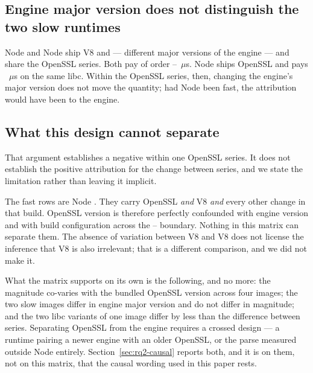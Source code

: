 \documentclass[pdflatex,sn-basic,twocolumn]{sn-jnl}%
\begin{document}
\subsection{Engine major version does not distinguish the two slow runtimes}

Node \NodeEighteenNodeMajor{} and Node \NodeTwentyNodeMajor{} ship V8
\NodeEighteenVeight{} and \NodeTwentyVeight{} --- different major versions of the
engine --- and share the OpenSSL \NodeEighteenOpensslSeries{} series. Both pay of
order \NodeEighteenProbeThrows--\NodeTwentyProbeThrows~$\mu$s. Node
\NodeTwentySixMuslNodeMajor{} ships OpenSSL \NodeTwentySixMuslOpensslSeries{} and
pays \NodeTwentySixMuslProbeThrows~$\mu$s on the same libc. Within the OpenSSL
\NodeEighteenOpensslSeries{} series, then, changing the engine's major version
does not move the quantity; had Node \NodeTwentyNodeMajor{} been fast, the
attribution would have been to the engine.

\subsection{What this design cannot separate}\label{sec:cannot-separate}

That argument establishes a negative within one OpenSSL series. It does not
establish the positive attribution for the change between series, and we state
the limitation rather than leaving it implicit.

The fast rows are Node \NodeTwentySixMuslNodeMajor. They carry OpenSSL
\NodeTwentySixMuslOpensslSeries{} \emph{and} V8 \NodeTwentySixMuslVeight{}
\emph{and} every other change in that build. OpenSSL version is therefore
perfectly confounded with engine version and with build configuration across the
\NodeEighteenOpensslSeries--\NodeTwentySixMuslOpensslSeries{} boundary. Nothing
in this matrix can separate them. The absence of variation between V8
\NodeEighteenVeight{} and V8 \NodeTwentyVeight{} does not license the inference
that V8 \NodeTwentySixMuslVeight{} is also irrelevant; that is a different
comparison, and we did not make it.

What the matrix supports on its own is the following, and no more: the
magnitude co-varies with the bundled OpenSSL version across four images; the two
slow images differ in engine major version and do not differ in magnitude; and
the two libc variants of one image differ by less than the difference between
series. Separating OpenSSL from the engine requires a crossed design --- a
runtime pairing a newer engine with an older OpenSSL, or the parse measured
outside Node entirely. Section~\ref{sec:rq2-causal} reports both, and it is on
them, not on this matrix, that the causal wording used in this paper rests.
\end{document}
